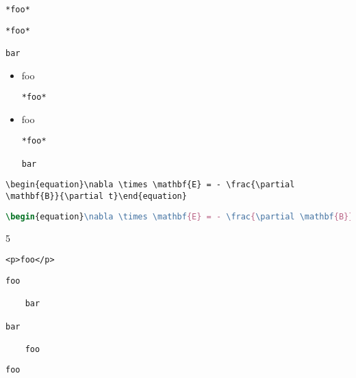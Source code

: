 
\def\mytitle{Fenced Code Blocks}


\begin{verbatim}
*foo*
\end{verbatim}

\begin{verbatim}
*foo*

bar
\end{verbatim}

\begin{itemize}
\item{} foo

\begin{verbatim}
*foo*
\end{verbatim}

\item{} foo

\begin{verbatim}
*foo*

bar
\end{verbatim}

\end{itemize}

\begin{verbatim}
\begin{equation}\nabla \times \mathbf{E} = - \frac{\partial \mathbf{B}}{\partial t}\end{equation}
\end{verbatim}

\begin{lstlisting}[language=tex]
\begin{equation}\nabla \times \mathbf{E} = - \frac{\partial \mathbf{B}}{\partial t}\end{equation}
\end{lstlisting}

5

\begin{verbatim}
<p>foo</p>
\end{verbatim}

\begin{verbatim}
foo

	bar

bar

    foo
\end{verbatim}

\begin{verbatim}
foo
\end{verbatim}



